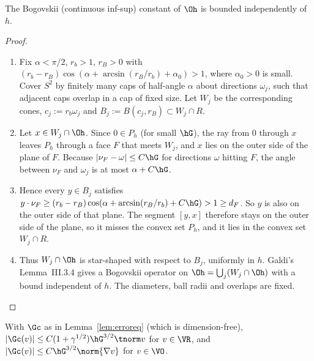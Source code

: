 \begin{lemma}\label{td:bog}
The Bogovskii (continuous inf-sup) constant of $\Oh$ is bounded independently of $h$.
\end{lemma}

\begin{proof}
\begin{enumerate}
\item Fix $\alpha<\pi/2$, $r_b>1$, $r_B>0$ with $(r_b-r_B)\cos(\alpha+\arcsin(r_B/r_b)+\alpha_0)>1$, where $\alpha_0>0$ is small. Cover $S^2$ by finitely many caps of half-angle $\alpha$ about directions $\omega_j$, such that adjacent caps overlap in a cap of fixed size. Let $W_j$ be the corresponding cones, $c_j:=r_b\omega_j$ and $B_j:=B(c_j,r_B)\subset W_j\cap R$.
\item Let $x\in W_j\cap\Oh$. Since $0\in P_h$ (for small $\hG$), the ray from $0$ through $x$ leaves $P_h$ through a face $F$ that meets $W_j$, and $x$ lies on the outer side of the plane of $F$. Because $|\nu_F-\omega|\le C\hG$ for directions $\omega$ hitting $F$, the angle between $\nu_F$ and $\omega_j$ is at most $\alpha+C\hG$.
\item Hence every $y\in B_j$ satisfies $y\cdot\nu_F\ge(r_b-r_B)\cos(\alpha+\arcsin(r_B/r_b)+C\hG)>1\ge d_F$. So $y$ is also on the outer side of that plane. The segment $[y,x]$ therefore stays on the outer side of the plane, so it misses the convex set $P_h$, and it lies in the convex set $W_j\cap R$.
\item Thus $W_j\cap\Oh$ is star-shaped with respect to $B_j$, uniformly in $h$. Galdi's Lemma~III.3.4 \cite{Galdi} gives a Bogovskii operator on $\Oh=\bigcup_j(W_j\cap\Oh)$ with a bound independent of $h$. The diameters, ball radii and overlaps are fixed.\qedhere
\end{enumerate}
\end{proof}

\begin{lemma}\label{td:G}
With $\Gc$ as in Lemma~\ref{lem:erroreq} (which is dimension-free), $|\Gc(v)|\le C(1+\gamma^{1/2})\hG^{3/2}\tnorm v$ for $v\in\VR$, and $|\Gc(v)|\le C\hG^{3/2}\norm{\nabla v}$ for $v\in\VO$.
\end{lemma}

